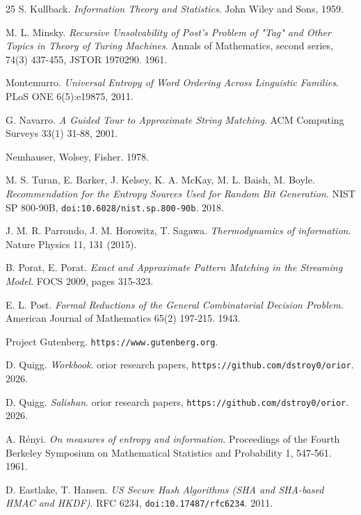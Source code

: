 \begin{thebibliography}{25}
S. Kullback. \emph{Information Theory and Statistics}. John Wiley and Sons, 1959.

M. L. Minsky. \emph{Recursive Unsolvability of Post's Problem of "Tag" and Other Topics in Theory of Turing Machines}. Annals of Mathematics, second series, 74(3) 437-455, JSTOR 1970290. 1961.

Montemurro. \emph{Universal Entropy of Word Ordering Across Linguistic Families}. PLoS ONE 6(5):e19875, 2011.

G. Navarro. \emph{A Guided Tour to Approximate String Matching}. ACM Computing Surveys 33(1) 31-88, 2001.

Nemhauser, Wolsey, Fisher. 1978.

M. S. Turan, E. Barker, J. Kelsey, K. A. McKay, M. L. Baish, M. Boyle. \emph{Recommendation for the Entropy Sources Used for Random Bit Generation}. NIST SP 800-90B, \texttt{doi:10.6028/\allowbreak{}nist.sp.800-90b}. 2018.

J. M. R. Parrondo, J. M. Horowitz, T. Sagawa. \emph{Thermodynamics of information}. Nature Physics 11, 131 (2015).

B. Porat, E. Porat. \emph{Exact and Approximate Pattern Matching in the Streaming Model}. FOCS 2009, pages 315-323.

E. L. Post. \emph{Formal Reductions of the General Combinatorial Decision Problem}. American Journal of Mathematics 65(2) 197-215. 1943.

Project Gutenberg. \texttt{https:/\allowbreak{}/\allowbreak{}www.gutenberg.org}.

D. Quigg. \emph{Workbook}. orior research papers, \texttt{https:/\allowbreak{}/\allowbreak{}github.com/\allowbreak{}dstroy0/\allowbreak{}orior}. 2026.

D. Quigg. \emph{Salishan}. orior research papers, \texttt{https:/\allowbreak{}/\allowbreak{}github.com/\allowbreak{}dstroy0/\allowbreak{}orior}. 2026.

A. Rényi. \emph{On measures of entropy and information}. Proceedings of the Fourth Berkeley Symposium on Mathematical Statistics and Probability 1, 547-561. 1961.

D. Eastlake, T. Hansen. \emph{US Secure Hash Algorithms (SHA and SHA-based HMAC and HKDF)}. RFC 6234, \texttt{doi:10.17487/\allowbreak{}rfc6234}. 2011.


\end{thebibliography}
